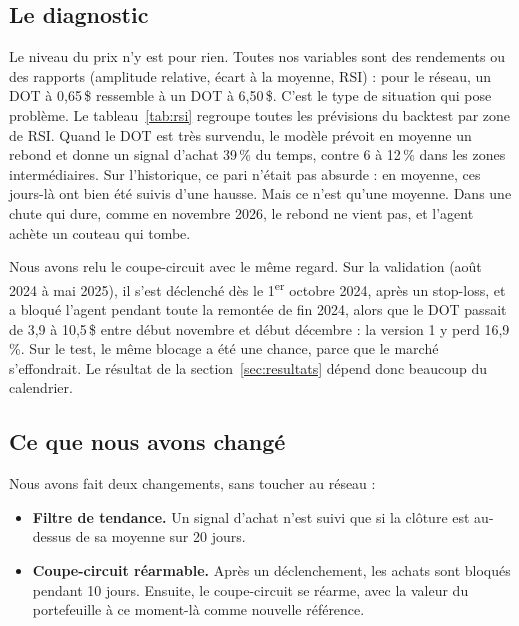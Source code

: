\documentclass[11pt,a4paper]{article}
\newcommand{\dollar}{\,\$}
\begin{document}
\subsection{Le diagnostic}

Le niveau du prix n'y est pour rien. Toutes nos variables sont des rendements ou des rapports (amplitude relative, écart à la moyenne, RSI) :
pour le réseau, un DOT à 0,65\dollar{} ressemble à un DOT à 6,50\dollar{}. C'est le type de situation qui pose problème. Le tableau~\ref{tab:rsi}
regroupe toutes les prévisions du backtest par zone de RSI. Quand le DOT est très survendu, le modèle prévoit en moyenne un rebond et donne un
signal d'achat 39\,\% du temps, contre 6 à 12\,\% dans les zones intermédiaires. Sur l'historique, ce pari n'était pas absurde : en moyenne, ces
jours-là ont bien été suivis d'une hausse. Mais ce n'est qu'une moyenne. Dans une chute qui dure, comme en novembre 2026, le rebond ne vient pas, et
l'agent achète un couteau qui tombe.

\begin{table}[H]\centering\small

\caption{Prévisions du LSTM selon la zone de RSI (toutes les périodes, cinq groupes de même taille).}\label{tab:rsi}
\end{table}

Nous avons relu le coupe-circuit avec le même regard. Sur la validation (août 2024 à mai 2025), il s'est déclenché dès le 1\textsuperscript{er} octobre 2024, après un stop-loss, et a bloqué l'agent
pendant toute la remontée de fin 2024, alors que le DOT passait de 3,9 à 10,5\dollar{} entre début novembre et début décembre : la version 1 y perd 16,9\,\%. Sur le test, le même blocage a été une chance, parce que le marché s'effondrait.
Le résultat de la section~\ref{sec:resultats} dépend donc beaucoup du calendrier.

\subsection{Ce que nous avons changé}

Nous avons fait deux changements, sans toucher au réseau :
\begin{itemize}
\item \textbf{Filtre de tendance.} Un signal d'achat n'est suivi que si la clôture est au-dessus de sa moyenne sur 20 jours.
\item \textbf{Coupe-circuit réarmable.} Après un déclenchement, les achats sont bloqués pendant 10 jours. Ensuite, le coupe-circuit se réarme, avec la
valeur du portefeuille à ce moment-là comme nouvelle référence.
\end{itemize}
\end{document}
